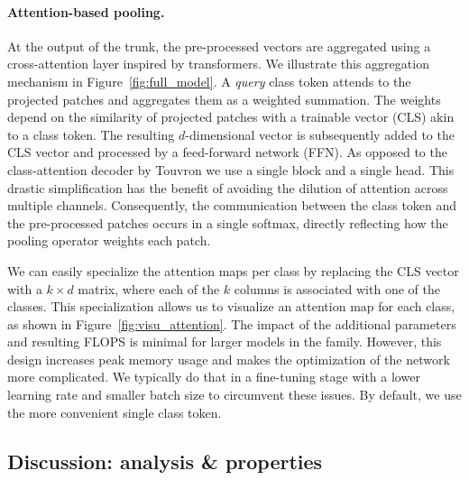 \paragraph{Attention-based pooling.} 
At the output of the trunk, the pre-processed vectors are aggregated using a cross-attention layer inspired by transformers.
We illustrate this aggregation mechanism in Figure~\ref{fig:full_model}. 
A \emph{query} class token attends to the projected patches and aggregates them as a weighted summation. 
The weights depend on the similarity of projected patches with a trainable vector (CLS) akin to a class token. 
The resulting $d$-dimensional vector is subsequently added to the CLS vector and processed by a feed-forward network (FFN). 
As opposed to the class-attention decoder by Touvron \etal\cite{touvron2021going} we use a single block and a single head. 
This drastic simplification has the benefit of avoiding the dilution of attention across multiple channels. 
Consequently, the communication between the class token and the pre-processed patches occurs in a single softmax, directly reflecting how the pooling operator weights each patch. 

We can easily specialize the attention maps per class by replacing the CLS vector with a  $k \times d$ matrix, where each of the $k$ columns is associated with one of the classes. 
This specialization allows us to visualize an attention map for each class, as shown in Figure~\ref{fig:visu_attention}. 
The impact of the additional parameters and resulting FLOPS is minimal for larger models in the family. 
However, this design increases peak memory usage and makes the optimization of the network more complicated.
We typically do that in a fine-tuning stage with a lower learning rate and smaller batch size to circumvent these issues. 
By default, we use the more convenient single class token. 


\subsection{Discussion: analysis \& properties}
\label{sec:analysis}

